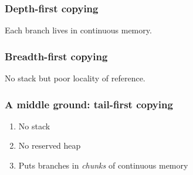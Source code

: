 \begin{frame}
  \frametitle{Depth-first copying}
  \begin{figure}
    \centering
    
  \end{figure}
  \begin{center}
    Each branch lives in continuous memory.
  \end{center}
\end{frame}

\begin{frame}
  \frametitle{Breadth-first copying}
  \begin{figure}
    \centering
    
  \end{figure}
  \pause
  \begin{center}
    No stack but poor locality of reference.
  \end{center}
\end{frame}

\begin{frame}
  \frametitle{A middle ground: tail-first copying}
  \begin{enumerate}
    \item No stack
    \item No reserved heap
    \item Puts branches in \emph{chunks} of continuous memory
  \end{enumerate}
\end{frame}
